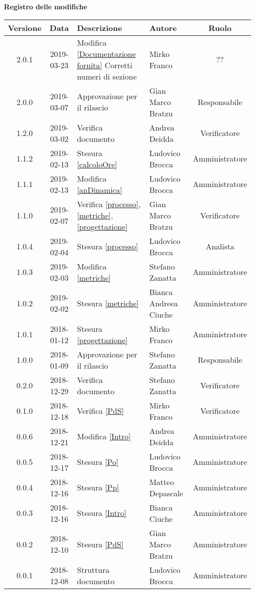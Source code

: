 \begin{center}
	\textbf{Registro delle modifiche}
	\end{center}
	\begin{center}
		\begin{tabularx}{\textwidth}{|c|c|X|X|c|}
			\hline
			\textbf{Versione} & \textbf{Data} & \textbf{Descrizione} & \textbf{Autore} & \textbf{Ruolo} \\ 
			\hline
			2.0.1 & 2019-03-23 & Modifica \ref{Documentazione fornita} Corretti numeri di sezione & Mirko Franco & ?? \\
			\hline
			2.0.0 &2019-03-07 & Approvazione per il rilascio & Gian Marco Bratzu& Responsabile\\
			\hline
			1.2.0 &2019-03-02 & Verifica documento &Andrea Deidda& Verificatore\\
			\hline
			1.1.2 &2019-02-13 &Stesura \ref{calcoloOre} &Ludovico Brocca& Amministratore\\
			\hline
			1.1.1 &2019-02-13 &Modifica \ref{anDinamica} &Ludovico Brocca& Amministratore\\
			\hline
			1.1.0 &2019-02-07 &Verifica \ref{processo}, \ref{metriche}, \ref{progettazione} &Gian Marco Bratzu& Verificatore\\
			\hline
			1.0.4 &2019-02-04&Stesura \ref{processo}&Ludovico Brocca& Analista\\
			\hline
			1.0.3 & 2019-02-03 & Modifica \ref{metriche} & Stefano Zanatta & Amministratore\\
			\hline
			1.0.2 & 2019-02-02 & Stesura \ref{metriche} & Bianca Andreea Ciuche & Amministratore\\
			\hline
			1.0.1 & 2018-01-12 & Stesura \ref{progettazione} & Mirko Franco & Amministratore \\
			\hline
			1.0.0 & 2018-01-09 & Approvazione per il rilascio & Stefano Zanatta & Responsabile\\
			\hline
			0.2.0 & 2018-12-29 & Verifica documento & Stefano Zanatta & Verificatore\\
			\hline
			0.1.0 & 2018-12-18 & Verifica \ref{PdS} & Mirko Franco & Verificatore\\
			\hline
			0.0.6 & 2018-12-21 & Modifica \ref{Intro} & Andrea Deidda & Amministratore\\
			\hline
			0.0.5 & 2018-12-17 & Stesura \ref{Po} & Ludovico Brocca & Amministratore\\
			\hline
			0.0.4 & 2018-12-16 & Stesura \ref{Pp} & Matteo Depascale & Amministratore\\
			\hline
			0.0.3 & 2018-12-16 & Stesura \ref{Intro} & Bianca Ciuche & Amministratore\\
			\hline
			0.0.2 & 2018-12-10 & Stesura \ref{PdS} & Gian Marco Bratzu & Amministratore\\	
			\hline
			0.0.1 & 2018-12-08 & Struttura documento  & Ludovico Brocca & Amministratore\\
			\hline
	\end{tabularx}
	\end{center}

\newpage